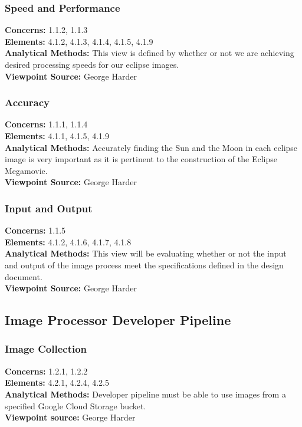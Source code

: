 \documentclass[10pt, onecolumn, draftclsnofoot, letterpaper, compsoc]{IEEEtran}
\begin{document}
\subsubsection{Speed and Performance}

\textbf{Concerns:} 1.1.2, 1.1.3 \\
\textbf{Elements:} 4.1.2, 4.1.3, 4.1.4, 4.1.5, 4.1.9 \\
\textbf{Analytical Methods:} This view is defined by whether or not we are
achieving desired processing speeds for our eclipse images. \\
\textbf{Viewpoint Source:} George Harder \\

\subsubsection{Accuracy}

\textbf{Concerns:} 1.1.1, 1.1.4 \\
\textbf{Elements:} 4.1.1, 4.1.5, 4.1.9 \\
\textbf{Analytical Methods:} Accurately finding the Sun and the Moon in each
eclipse image is very important as it is pertinent to the construction of the
Eclipse Megamovie. \\
\textbf{Viewpoint Source:} George Harder \\

\subsubsection{Input and Output}

\textbf{Concerns:} 1.1.5 \\
\textbf{Elements:} 4.1.2, 4.1.6, 4.1.7, 4.1.8 \\
\textbf{Analytical Methods:} This view will be evaluating whether or not the
input and output of the image process meet the specifications defined in the
design document. \\
\textbf{Viewpoint Source:} George Harder\\

\subsection{Image Processor Developer Pipeline}
    \subsubsection{Image Collection}
    \textbf{Concerns:} 1.2.1, 1.2.2 \\
    \textbf{Elements:} 4.2.1, 4.2.4, 4.2.5 \\
    \textbf{Analytical Methods:} Developer pipeline must be able to use images
    from a specified Google Cloud Storage bucket. \\
    \textbf{Viewpoint source:} George Harder \\
\end{document}
